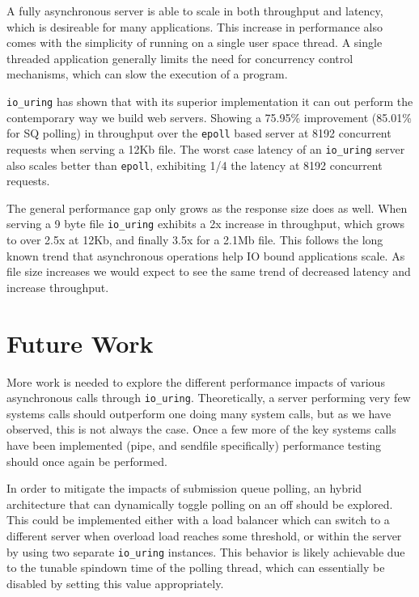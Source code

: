 \documentclass[letterpaper, 10pt, twocolumn]{article}
\begin{document}
A fully asynchronous server is able to scale in both throughput and latency, which is desireable for many applications. This increase in performance also comes with the simplicity of running on a single user space thread. A single threaded application generally limits the need for concurrency control mechanisms, which can slow the execution of a program.

\texttt{io\_uring} has shown that with its superior implementation it can out perform the contemporary way we build web servers. Showing a 75.95\% improvement (85.01\% for SQ polling) in throughput over the \texttt{epoll} based server at 8192 concurrent requests when serving a 12Kb file. The worst case latency of an \texttt{io\_uring} server also scales better than \texttt{epoll}, exhibiting 1/4 the latency at 8192 concurrent requests.

The general performance gap only grows as the response size does as well. When serving a 9 byte file \texttt{io\_uring} exhibits a 2x increase in throughput, which grows to over 2.5x at 12Kb, and finally 3.5x for a 2.1Mb file. This follows the long known trend that asynchronous operations help IO bound applications scale. As file size increases we would expect to see the same trend of decreased latency and increase throughput.
\section{Future Work}
\label{sec:org24506f8}
More work is needed to explore the different performance impacts of various asynchronous calls through \texttt{io\_uring}. Theoretically, a server performing very few systems calls should outperform one doing many system calls, but as we have observed, this is not always the case. Once a few more of the key systems calls have been implemented (pipe, and sendfile specifically) performance testing should once again be performed.

In order to mitigate the impacts of submission queue polling, an hybrid architecture that can dynamically toggle polling on an off should be explored. This could be implemented either with a load balancer which can switch to a different server when overload load reaches some threshold, or within the server by using two separate \texttt{io\_uring} instances. This behavior is likely achievable due to the tunable spindown time of the polling thread, which can essentially be disabled by setting this value appropriately.
\end{document}
